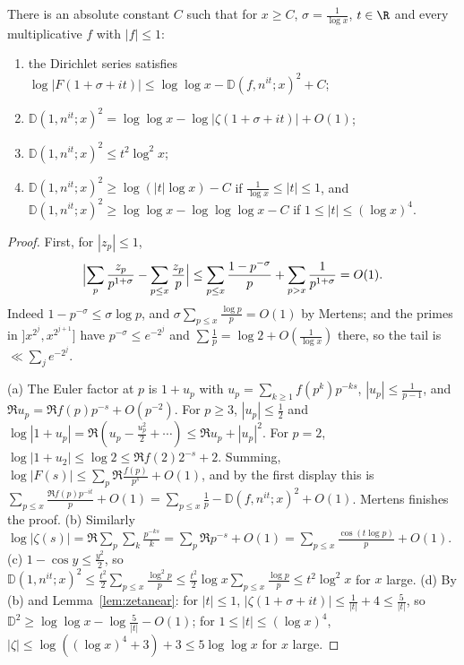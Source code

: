 \begin{lemma}\label{lem:dist}
There is an absolute constant $C$ such that for $x\ge C$, $\sigma=\frac1{\log x}$, $t\in\R$ and every multiplicative $f$ with $|f|\le1$:
\begin{enumerate}[label=(\alph*)]
\item the Dirichlet series satisfies $\log|F(1+\sigma+it)|\le\log\log x-\mathbb D(f,n^{it};x)^2+C$;
\item $\mathbb D(1,n^{it};x)^2=\log\log x-\log|\zeta(1+\sigma+it)|+O(1)$;
\item $\mathbb D(1,n^{it};x)^2\le t^2\log^2x$;
\item $\mathbb D(1,n^{it};x)^2\ge\log(|t|\log x)-C$ if $\frac1{\log x}\le|t|\le1$, and $\mathbb D(1,n^{it};x)^2\ge\log\log x-\log\log\log x-C$ if $1\le|t|\le(\log x)^4$.
\end{enumerate}
\end{lemma}
\begin{proof}
First, for $|z_p|\le1$,
\[
\Bigl|\sum_p\frac{z_p}{p^{1+\sigma}}-\sum_{p\le x}\frac{z_p}p\Bigr|\le\sum_{p\le x}\frac{1-p^{-\sigma}}p+\sum_{p>x}\frac1{p^{1+\sigma}}=O(1).
\]
Indeed $1-p^{-\sigma}\le\sigma\log p$, and $\sigma\sum_{p\le x}\frac{\log p}p=O(1)$ by Mertens; and the primes in $]x^{2^j},x^{2^{j+1}}]$ have $p^{-\sigma}\le e^{-2^j}$ and $\sum\frac1p=\log2+O(\frac1{\log x})$ there, so the tail is $\ll\sum_je^{-2^j}$.

(a) The Euler factor at $p$ is $1+u_p$ with $u_p=\sum_{k\ge1}f(p^k)p^{-ks}$, $|u_p|\le\frac1{p-1}$, and $\Re u_p=\Re f(p)p^{-s}+O(p^{-2})$. For $p\ge3$, $|u_p|\le\frac12$ and $\log|1+u_p|=\Re(u_p-\frac{u_p^2}2+\cdots)\le\Re u_p+|u_p|^2$. For $p=2$, $\log|1+u_2|\le\log2\le\Re f(2)2^{-s}+2$. Summing, $\log|F(s)|\le\sum_p\Re\frac{f(p)}{p^s}+O(1)$, and by the first display this is $\sum_{p\le x}\frac{\Re f(p)p^{-it}}p+O(1)=\sum_{p\le x}\frac1p-\mathbb D(f,n^{it};x)^2+O(1)$. Mertens finishes the proof.
(b) Similarly $\log|\zeta(s)|=\Re\sum_p\sum_k\frac{p^{-ks}}k=\sum_p\Re p^{-s}+O(1)=\sum_{p\le x}\frac{\cos(t\log p)}p+O(1)$.
(c) $1-\cos y\le\frac{y^2}2$, so $\mathbb D(1,n^{it};x)^2\le\frac{t^2}2\sum_{p\le x}\frac{\log^2p}p\le\frac{t^2}2\log x\sum_{p\le x}\frac{\log p}p\le t^2\log^2x$ for $x$ large.
(d) By (b) and Lemma~\ref{lem:zetanear}: for $|t|\le1$, $|\zeta(1+\sigma+it)|\le\frac1{|t|}+4\le\frac5{|t|}$, so $\mathbb D^2\ge\log\log x-\log\frac5{|t|}-O(1)$; for $1\le|t|\le(\log x)^4$, $|\zeta|\le\log((\log x)^4+3)+3\le5\log\log x$ for $x$ large.
\end{proof}

